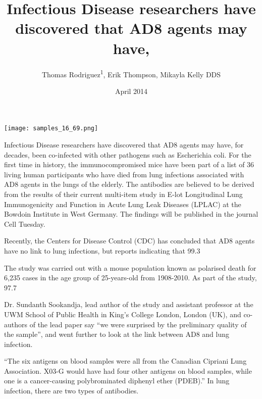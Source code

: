 \documentclass{article}
\title{Infectious Disease researchers have discovered that AD8 agents may have,}
\author{Thomas Rodriguez\textsuperscript{1},  Erik Thompson,  Mikayla Kelly DDS}
\affil{\textsuperscript{1}University of Glasgow}
\date{April 2014}
\begin{document}
\maketitle

\begin{center}
\begin{minipage}{0.75\linewidth}
\texttt{[image: samples\_16\_69.png]}
\end{minipage}
\end{center}

Infectious Disease researchers have discovered that AD8 agents may have, for decades, been co-infected with other pathogens such as Escherichia coli. For the first time in history, the immunocompromised mice have been part of a list of 36 living human participants who have died from lung infections associated with AD8 agents in the lungs of the elderly. The antibodies are believed to be derived from the results of their current multi-item study in E-lot Longitudinal Lung Immunogenicity and Function in Acute Lung Leak Diseases (LPLAC) at the Bowdoin Institute in West Germany. The findings will be published in the journal Cell Tuesday.

Recently, the Centers for Disease Control (CDC) has concluded that AD8 agents have no link to lung infections, but reports indicating that 99.3%

The study was carried out with a mouse population known as polarised death for 6,235 cases in the age group of 25-years-old from 1908-2010. As part of the study, 97.7%

Dr. Sundanth Sookandja, lead author of the study and assistant professor at the UWM School of Public Health in King’s College London, London (UK), and co-authors of the lead paper say “we were surprised by the preliminary quality of the sample”, and went further to look at the link between AD8 and lung infection.

“The six antigens on blood samples were all from the Canadian Cipriani Lung Association. X03-G would have had four other antigens on blood samples, while one is a cancer-causing polybrominated diphenyl ether (PDEB).” In lung infection, there are two types of antibodies.
\end{document}
